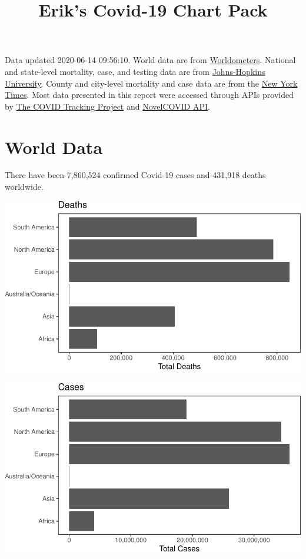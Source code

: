 \documentclass[]{article}
\title{Erik's Covid-19 Chart Pack}
\author{}
\date{}
\begin{document}
\maketitle

Data updated 2020-06-14 09:56:10. World data are from
\href{https://github.com/NovelCovid/API}{Worldometers}. National and
state-level mortality, case, and testing data are from
\href{https://covidtracking.com}{Johns-Hopkins University}. County and
city-level mortality and case data are from the
\href{https://github.com/NovelCovid/API}{New York Times}. Most data
presented in this report were accessed through APIs provided by
\href{https://covidtracking.com}{The COVID Tracking Project} and
\href{https://github.com/NovelCovid/API}{NovelCOVID API}.

\hypertarget{world-data}{%
\section{World Data}\label{world-data}}

There have been 7,860,524 confirmed Covid-19 cases and 431,918 deaths
worldwide.

\includegraphics{covid_files/figure-latex/unnamed-chunk-1-1.pdf}

\includegraphics{covid_files/figure-latex/unnamed-chunk-2-1.pdf}
\end{document}
